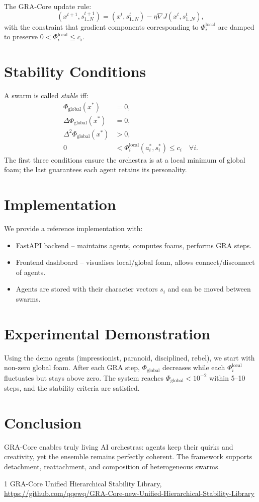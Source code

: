 \documentclass[twocolumn]{article}
\begin{document}
The GRA-Core update rule:
\begin{equation}
(x^{t+1}, s_{1..N}^{t+1}) = (x^t, s_{1..N}^t) - \eta \nabla J(x^t, s_{1..N}^t),
\end{equation}
with the constraint that gradient components corresponding to $\Phi_i^{\text{local}}$ are damped to preserve $0 < \Phi_i^{\text{local}} \le c_i$.

\section{Stability Conditions}
A swarm is called \emph{stable} iff:
\begin{align}
\Phi_{\text{global}}(x^*) &= 0, \\
\Delta \Phi_{\text{global}}(x^*) &= 0, \\
\Delta^2 \Phi_{\text{global}}(x^*) &> 0, \\
0 &< \Phi_i^{\text{local}}(a_i^*, s_i^*) \le c_i \quad \forall i.
\end{align}
The first three conditions ensure the orchestra is at a local minimum of global foam; the last guarantees each agent retains its personality.

\section{Implementation}
We provide a reference implementation with:
\begin{itemize}
    \item FastAPI backend -- maintains agents, computes foams, performs GRA steps.
    \item Frontend dashboard -- visualises local/global foam, allows connect/disconnect of agents.
    \item Agents are stored with their character vectors $s_i$ and can be moved between swarms.
\end{itemize}

\section{Experimental Demonstration}
Using the demo agents (impressionist, paranoid, disciplined, rebel), we start with non-zero global foam. After each GRA step, $\Phi_{\text{global}}$ decreases while each $\Phi_i^{\text{local}}$ fluctuates but stays above zero. The system reaches $\Phi_{\text{global}}<10^{-2}$ within 5--10 steps, and the stability criteria are satisfied.

\section{Conclusion}
GRA-Core enables truly living AI orchestras: agents keep their quirks and creativity, yet the ensemble remains perfectly coherent. The framework supports detachment, reattachment, and composition of heterogeneous swarms.


\begin{thebibliography}{1}
 GRA-Core Unified Hierarchical Stability Library, \url{https://github.com/qqewq/GRA-Core-new-Unified-Hierarchical-Stability-Library}
\end{thebibliography}
\end{document}
